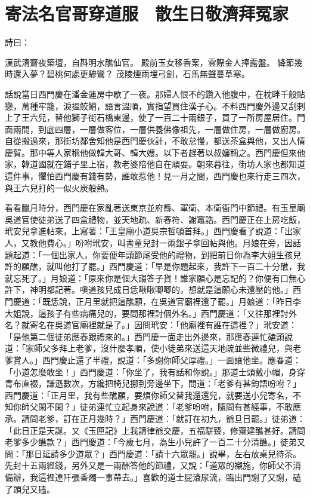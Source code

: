 %

\chapter{寄法名官哥穿道服　散生日敬濟拜冤家}

詩曰：

漢武清齋夜築壇，自斟明水醮仙官。
殿前玉女移香案，雲際金人捧露盤。
絳節幾時還入夢？碧桃何處更驂鸞？
茂陵煙雨埋弓劍，石馬無聲蔓草寒。

話說當日西門慶在潘金蓮房中歇了一夜。那婦人恨不的鑽入他腹中，在枕畔千般貼戀，萬種牢籠，淚搵鮫鮹，語言溫順，實指望買住漢子心。不料西門慶外邊又刮剌上了王六兒，替他獅子街石橋東邊，使了一百二十兩銀子，買了一所房屋居住。門面兩間，到底四層，一層做客位，一層供養佛像祖先，一層做住房，一層做廚房。自從搬過來，那街坊鄰舍知他是西門慶伙計，不敢怠慢，都送茶盒與他，又出人情慶賀。那中等人家稱他做韓大哥、韓大嫂。以下者趕著以叔嬸稱之。西門慶但來他家，韓道國就在鋪子里上宿，教老婆陪他自在頑耍。朝來暮往，街坊人家也都知道這件事，懼怕西門慶有錢有勢，誰敢惹他！見一月之間，西門慶也來行走三四次，與王六兒打的一似火炭般熱。

看看臘月時分，西門慶在家亂著送東京並府縣、軍衛、本衛衙門中節禮。有玉皇廟吳道官使徒弟送了四盒禮物，並天地疏、新春符、謝竈誥。西門慶正在上房吃飯，玳安兒拿進帖來，上寫著：「王皇廟小道吳宗哲頓首拜。」西門慶看了說道：「出家人，又教他費心。」吩咐玳安，叫書童兒封一兩銀子拿回帖與他。月娘在旁，因話題起道：「一個出家人，你要便年頭節尾受他的禮物，到把前日你為李大姐生孩兒許的願醮，就叫他打了罷。」西門慶道：「早是你題起來，我許下一百二十分醮，我就忘死了。」月娘道：「原來你是個大謅答子貨！誰家願心是忘記的？你便有口無心許下，神明都記著。嗔道孩兒成日恁啾啾唧唧的，想就是這願心未還壓的他。」西門慶道：「既恁說，正月里就把這醮願，在吳道官廟裡還了罷。」月娘道：「昨日李大姐說，這孩子有些病痛兒的，要問那裡討個外名。」西門慶道：「又往那裡討外名？就寄名在吳道官廟裡就是了。」因問玳安：「他廟裡有誰在這裡？」玳安道：「是他第二個徒弟應春跟禮來的。」西門慶一面走出外邊來，那應春連忙磕頭說道：「家師父多拜上老爹，沒什麼孝順，使小徒弟來送這天地疏並些微禮兒，與老爹賞人。」西門慶止還了半禮，說道：「多謝你師父厚禮。」一面讓他坐。應春道：「小道怎麼敢坐！」西門慶道：「你坐了，我有話和你說。」那道士頭戴小帽，身穿青布直裰，謙遜數次，方纔把椅兒挪到旁邊坐下，問道：「老爹有甚鈞語吩咐？」西門慶道：「正月里，我有些醮願，要煩你師父替我還還兒，就要送小兒寄名，不知你師父閑不閑？」徒弟連忙立起身來說道：「老爹吩咐，隨問有甚經事，不敢應承。請問老爹，訂在正月幾時？」西門慶道：「就訂在初九，爺旦日罷。」徒弟道：「此日正是天誕。又《玉匣記》上我請律爺交慶，五福駢臻，修齋建醮甚好。請問老爹多少醮款？」西門慶道：「今歲七月，為生小兒許了一百二十分清醮。」徒弟又問：「那日延請多少道眾？」西門慶道：「請十六眾罷。」說畢，左右放桌兒待茶。先封十五兩經錢，另外又是一兩酬答他的節禮，又說：「道眾的襯施，你師父不消備辦，我這裡連阡張香燭一事帶去。」喜歡的道士屁滾尿流，臨出門謝了又謝，磕了頭兒又磕。

